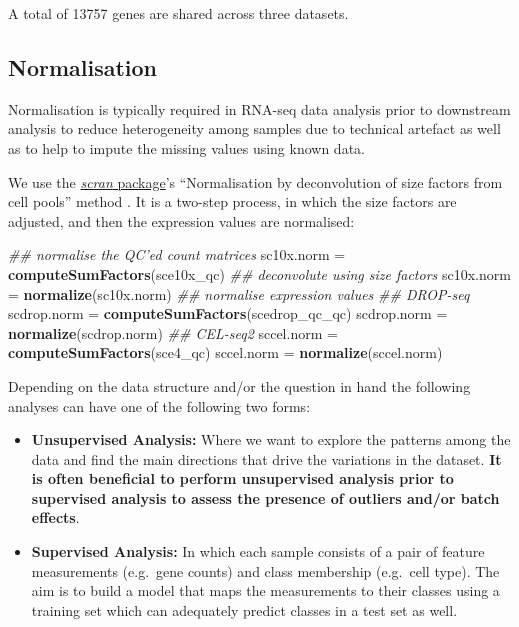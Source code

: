 \documentclass[]{book}
\newenvironment{Shaded}{\begin{snugshade}}{\end{snugshade}}
\newcommand{\CommentTok}[1]{\textcolor[rgb]{0.56,0.35,0.01}{\textit{#1}}}
\newcommand{\KeywordTok}[1]{\textcolor[rgb]{0.13,0.29,0.53}{\textbf{#1}}}
\newcommand{\NormalTok}[1]{#1}
\newcommand{\StringTok}[1]{\textcolor[rgb]{0.31,0.60,0.02}{#1}}
\theoremstyle{definition}
\theoremstyle{definition}
\theoremstyle{definition}
\theoremstyle{remark}
\begin{document}
A total of 13757 genes are shared across three datasets.

\hypertarget{normalisation}{%
\subsection{Normalisation}\label{normalisation}}

Normalisation is typically required in RNA-seq data analysis prior to
downstream analysis to reduce heterogeneity among samples due to
technical artefact as well as to help to impute the missing values using
known data.

We use the
\href{http://bioconductor.org/packages/release/bioc/html/scran.html}{\emph{scran}
package}'s ``Normalisation by deconvolution of size factors from cell
pools'' method \citep{scnorm}. It is a two-step process, in which the
size factors are adjusted, and then the expression values are
normalised:

\begin{Shaded}
\begin{Highlighting}[]
\CommentTok{## normalise the QC'ed count matrices}
\NormalTok{sc10x.norm =}\StringTok{  }\KeywordTok{computeSumFactors}\NormalTok{(sce10x_qc) }\CommentTok{## deconvolute using size factors}
\NormalTok{sc10x.norm =}\StringTok{  }\KeywordTok{normalize}\NormalTok{(sc10x.norm) }\CommentTok{## normalise expression values}
\CommentTok{## DROP-seq}
\NormalTok{scdrop.norm =}\StringTok{ }\KeywordTok{computeSumFactors}\NormalTok{(scedrop_qc_qc)}
\NormalTok{scdrop.norm =}\StringTok{ }\KeywordTok{normalize}\NormalTok{(scdrop.norm)}
\CommentTok{## CEL-seq2}
\NormalTok{sccel.norm =}\StringTok{  }\KeywordTok{computeSumFactors}\NormalTok{(sce4_qc)}
\NormalTok{sccel.norm =}\StringTok{  }\KeywordTok{normalize}\NormalTok{(sccel.norm)}
\end{Highlighting}
\end{Shaded}

Depending on the data structure and/or the question in hand the
following analyses can have one of the following two forms:

\begin{itemize}
\item
  \textbf{Unsupervised Analysis:} Where we want to explore the patterns
  among the data and find the main directions that drive the variations
  in the dataset. \textbf{It is often beneficial to perform unsupervised
  analysis prior to supervised analysis to assess the presence of
  outliers and/or batch effects}.
\item
  \textbf{Supervised Analysis:} In which each sample consists of a pair
  of feature measurements (e.g.~gene counts) and class membership
  (e.g.~cell type). The aim is to build a model that maps the
  measurements to their classes using a training set which can
  adequately predict classes in a test set as well.
\end{itemize}
\end{document}

